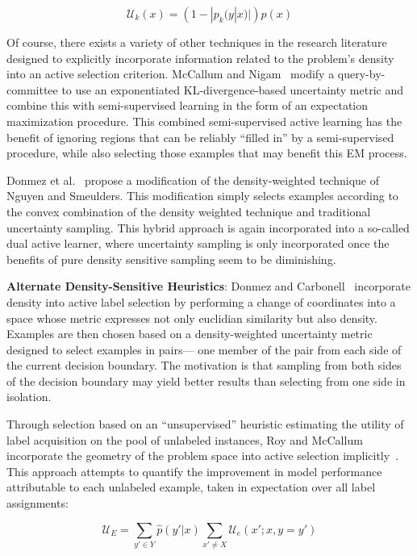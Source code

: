 $$ \mathcal{U}_k(x) = \left( 1 - |p_k(y|x)|  \right)p(x) $$

Of course, there exists a variety of other techniques in the research literature designed to explicitly incorporate information related to the problem's density into an active selection criterion. McCallum and Nigam~\cite{cmccallum98em} modify a query-by-committee to use an exponentiated KL-divergence-based uncertainty metric and combine this with semi-supervised learning in the form of an expectation maximization procedure. This combined semi-supervised active learning has the benefit of ignoring regions that can be reliably ``filled in'' by a semi-supervised procedure, while also selecting those examples that may benefit this EM process.

Donmez et al.~\cite{donmez07dual} propose a modification of the density-weighted technique of  Nguyen and Smeulders. This modification simply selects examples according to the convex combination of the density weighted technique and traditional uncertainty sampling. This hybrid approach is again incorporated into a so-called dual active learner, where uncertainty sampling is only incorporated once the benefits of pure density sensitive sampling seem to be diminishing.

\textbf{Alternate Density-Sensitive Heuristics}: Donmez and Carbonell~\cite{donmez2008psd} incorporate density into active label selection by performing a change of coordinates into a space whose metric expresses not only euclidian similarity but also density. Examples are then chosen based on a density-weighted  uncertainty metric designed to select examples in pairs--- one member of the pair from  each side of the current decision boundary. The motivation is that sampling from both sides of the decision boundary may yield better results than selecting from one side in isolation.

Through selection based on an  ``unsupervised'' heuristic estimating the utility of label acquisition on the pool of unlabeled instances, Roy and McCallum incorporate the geometry of the problem space into active selection implicitly~\cite{roy:ml01}. This approach attempts to quantify the improvement in model performance attributable to each unlabeled example, taken in expectation over all label assignments:

$$\mathcal{U}_E = \sum_{y' \in Y} \hat{p}(y' | x)\sum_{x' \ne X}\mathcal{U}_e(x';x,y=y')$$

